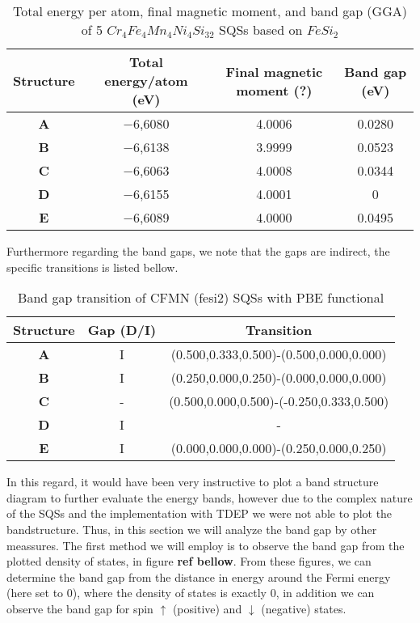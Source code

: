 \begin{table}[H]
\centering
\begin{tabular}{@{}cccc@{}}
\toprule
Structure  & Total energy/atom (eV) & Final magnetic moment (?) & Band gap (eV) \\ \midrule
\textbf{A} & −6,6080                & 4.0006                    & 0.0280        \\
\textbf{B} & −6,6138                & 3.9999                    & 0.0523        \\
\textbf{C} & −6,6063                & 4.0008                    & 0.0344        \\
\textbf{D} & −6,6155                & 4.0001                    & 0             \\
\textbf{E} & −6,6089                & 4.0000                    & 0.0495        \\ \bottomrule
\end{tabular}
\caption{Total energy per atom, final magnetic moment, and band gap (GGA) of 5 $Cr_4Fe_4Mn_4Ni_4Si_{32}$ SQSs based on $FeSi_2$}
\label{table:fesi2_summary}
\end{table}  
Furthermore regarding the band gaps, we note that the gaps are indirect, the specific transitions is listed bellow.

\begin{table}[H]
\centering
\begin{tabular}{@{}ccc@{}}
\toprule
Structure  & Gap (D/I) & Transition                              \\ \midrule
\textbf{A} & I         & (0.500,0.333,0.500)-(0.500,0.000,0.000)  \\
\textbf{B} & I         & (0.250,0.000,0.250)-(0.000,0.000,0.000)  \\
\textbf{C} & -         & (0.500,0.000,0.500)-(-0.250,0.333,0.500) \\
\textbf{D} & I         & -                                        \\
\textbf{E} & I         & (0.000,0.000,0.000)-(0.250,0.000,0.250)  \\ \bottomrule
\end{tabular}
\caption{Band gap transition of CFMN (fesi2) SQSs with PBE functional}
\end{table}

In this regard, it would have been very instructive to plot a band structure diagram to further evaluate the energy bands, however due to the complex nature of the SQSs and the implementation with TDEP we were not able to plot the bandstructure. Thus, in this section we will analyze the band gap by other meassures. The first method we will employ is to observe the band gap from the plotted density of states, in figure \textbf{ref bellow}. From these figures, we can determine the band gap from the distance in energy around the Fermi energy (here set to 0), where the density of states is exactly 0, in addition we can observe the band gap for spin $\uparrow$ (positive) and $\downarrow$ (negative) states.   


